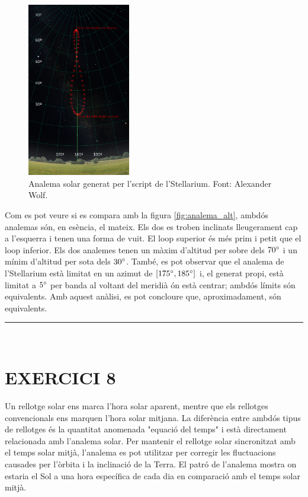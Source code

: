 \documentclass[a4paper, 11pt]{article}
\begin{document}
\vspace{2mm}
\begin{figure} [h!]
    \centering
    \includegraphics[width=0.40\textwidth]{images/analema_real.png}
    \caption{Analema solar generat per l'script de l'Stellarium. Font: Alexander Wolf.}
    \label{fig:analema_real}
\end{figure}
\vspace{2mm}

\noindent Com es pot veure si es compara amb la figura \ref{fig:analema_alt}, ambdós analemas són, en esència, el mateix. Els dos es troben inclinats lleugerament cap a l'esquerra i tenen una forma de vuit. El loop superior és més prim i petit que el loop inferior. Els dos analemes tenen un màxim d'altitud per sobre dels $70 \degree$ i un mínim d'altitud per sota dels $30 \degree$. També, es pot observar que el analema de l'Stellarium està limitat en un azimut de $[175\degree ,185\degree]$ i, el generat propi, està limitat a $5 \degree$ per banda al voltant del meridià ón està centrar; ambdós límits són equivalents. Amb aquest anàlisi, es pot concloure que, aproximadament, són equivalents. 

\vspace{10mm}
\hrule\
\vspace{5mm}


\section*{EXERCICI 8}
\noindent Un rellotge solar ens marca l'hora solar aparent, mentre que els rellotges convencionals ens marquen l'hora solar mitjana. La diferència entre ambdós tipus de rellotges és la quantitat anomenada "equació del temps" i està directament relacionada amb l'analema solar. Per mantenir el rellotge solar sincronitzat amb el temps solar mitjà, l'analema es pot utilitzar per corregir les fluctuacions causades per l'òrbita i la inclinació de la Terra. El patró de l'analema mostra on estaria el Sol a una hora específica de cada dia en comparació amb el temps solar mitjà.
\end{document}
